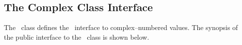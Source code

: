 \subsection{The Complex Class Interface}

The \efcomplexclass\ class defines the \efloat\ interface to
complex--numbered values. The synopsis of the public interface
to the \efcomplexclass\ class is shown below.

\vspace{4.0pt}



\vspace{4.0pt}

